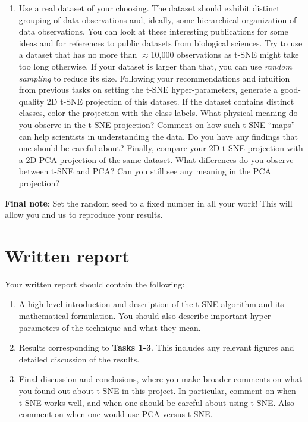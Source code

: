 \documentclass[11pt]{article}
\begin{document}
\begin{enumerate}[start=1,label={\bfseries Task \arabic*:}]
\item Use a real dataset of your choosing. The dataset should exhibit distinct grouping of data observations and, ideally, some hierarchical organization of data observations. You can look at these interesting publications \citep{amir2013visne, kobak2019art, kobak2021initialization} for some ideas and for references to public datasets from biological sciences. Try to use a dataset that has no more than $\approx$10,000 observations as t-SNE might take too long otherwise. If your dataset is larger than that, you can use \textit{random sampling} to reduce its size. Following your recommendations and intuition from previous tasks on setting the t-SNE hyper-parameters, generate a good-quality 2D t-SNE projection of this dataset. If the dataset contains distinct classes, color the projection with the class labels. What physical meaning do you observe in the t-SNE projection? Comment on how such t-SNE ``maps'' can help scientists in understanding the data. Do you have any findings that one should be careful about? Finally, compare your 2D t-SNE projection with a 2D PCA projection of the same dataset. What differences do you observe between t-SNE and PCA? Can you still see any meaning in the PCA projection?
\end{enumerate}

\textbf{Final note}: Set the random seed to a fixed number in all your work! This will allow you and us to reproduce your results.

\section*{Written report}

Your written report should contain the following:

\begin{enumerate}[start=1,label={\bfseries Section \arabic*:}]
\item A high-level introduction and description of the t-SNE algorithm and its mathematical formulation. You should also describe important hyper-parameters of the technique and what they mean.
\item Results corresponding to \textbf{Tasks 1-3}. This includes any relevant figures and detailed discussion of the results.
\item Final discussion and conclusions, where you make broader comments on what you found out about t-SNE in this project. In particular, comment on when t-SNE works well, and when one should be careful about using t-SNE. Also comment on when one would use PCA versus t-SNE.
\end{enumerate}
\end{document}
